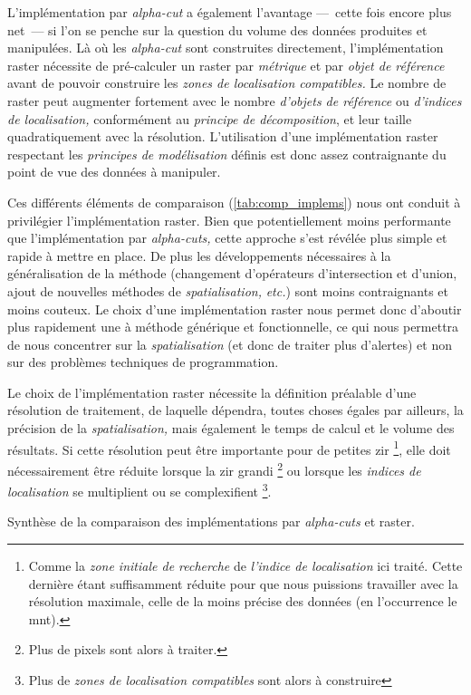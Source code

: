 L'implémentation par \emph{alpha-cut} a également l'avantage ---~cette
fois encore plus net~--- si l'on se penche sur la question du volume
des données produites et manipulées. Là où les \emph{alpha-cut} sont
construites directement, l'implémentation raster nécessite de
pré-calculer un raster par \emph{métrique} et par \emph{objet de
  référence} avant de pouvoir construire les \emph{zones de
  localisation compatibles.} Le nombre de raster peut augmenter
fortement avec le nombre \emph{d'objets de référence} ou
\emph{d'indices de localisation,} conformément au \emph{principe de
  décomposition}, et leur taille quadratiquement avec la
résolution. L'utilisation d'une implémentation raster respectant les
\emph{principes de modélisation} définis est donc assez contraignante
du point de vue des données à manipuler.

Ces différents éléments de comparaison (\autoref{tab:comp_implems})
nous ont conduit à privilégier l'implémentation raster. Bien que
potentiellement moins performante que l'implémentation par
\emph{alpha-cuts,} cette approche s'est révélée plus simple et rapide
à mettre en place. De plus les développements nécessaires à la
généralisation de la méthode (\eg changement d'opérateurs
d'intersection et d'union, ajout de nouvelles méthodes de
\emph{spatialisation,} \emph{etc.}) sont moins contraignants et moins
couteux. Le choix d'une implémentation raster nous permet donc
d'aboutir plus rapidement une à méthode générique et fonctionnelle, ce
qui nous permettra de nous concentrer sur la \emph{spatialisation} (et
donc de traiter plus d'alertes) et non sur des problèmes techniques de
programmation.

Le choix de l'implémentation raster nécessite la définition préalable
d'une résolution de traitement, de laquelle dépendra, toutes choses
égales par ailleurs, la précision de la \emph{spatialisation,} mais
également le temps de calcul et le volume des résultats. Si cette
résolution peut être importante pour de petites \ac{zir}
\footnote{Comme la \emph{zone initiale de recherche} de \emph{l'indice
    de localisation} ici traité. Cette dernière étant suffisamment
  réduite pour que nous puissions travailler avec la résolution
  maximale, celle de la moins précise des données (en l’occurrence le
  \ac{mnt}).}, elle doit nécessairement être réduite lorsque la
\ac{zir} grandi \footnote{Plus de pixels sont alors à traiter.} ou
lorsque les \emph{indices de localisation} se multiplient ou se
complexifient \footnote{Plus de \emph{zones de localisation
    compatibles} sont alors à construire}.

\begin{landscape}
  \begin{table}[!h]
    \centering
    
    \caption{Synthèse de la comparaison des implémentations par
      \emph{alpha-cuts} et raster.}
    \label{tab:comp_implems}
  \end{table}
\end{landscape}

